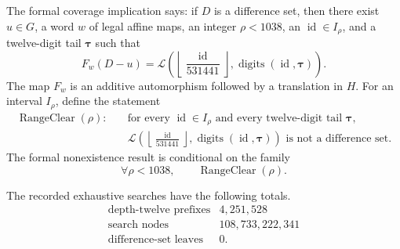 \documentclass[11pt]{article}
\begin{document}
\begin{appendices}
The formal coverage implication says: if $D$ is a
difference set, then there
exist $u\in G$, a word $w$
of legal affine maps, an
integer $\rho<1038$, an
$\operatorname{id}\in I_\rho$,
and a twelve-digit tail
$\boldsymbol\tau$ such that
\begin{equation}\label{eq:coverage}
 F_w(D-u)=\mathcal L\left(
 \left\lfloor\frac{\operatorname{id}}{531441}\right\rfloor,
 \operatorname{digits}(\operatorname{id},\boldsymbol\tau)
 \right).
\end{equation}
The map
$F_w$ is an additive
automorphism followed by a
translation in $H$.
For an interval $I_\rho$,
define the statement
\begin{equation}\label{eq:clear}
\begin{split}
 \operatorname{RangeClear}(\rho):\quad
 &\text{for every }\operatorname{id}\in I_\rho
 \text{ and every twelve-digit tail }\boldsymbol\tau,\\
 &\mathcal L\left(
 \left\lfloor\frac{\operatorname{id}}{531441}\right\rfloor,
 \operatorname{digits}(\operatorname{id},\boldsymbol\tau)
 \right)\text{ is not a difference set.}
\end{split}
\end{equation}
The formal nonexistence result
is conditional on the family
\[
 \forall \rho<1038,\qquad
 \operatorname{RangeClear}(\rho).
\]

The recorded exhaustive searches have the following totals.
\[
\begin{array}{c|r}
\text{depth-twelve prefixes}&4{,}251{,}528\\
\text{search nodes}&108{,}733{,}222{,}341\\
\text{difference-set leaves}&0.
\end{array}
\]

\end{appendices}
\end{document}

